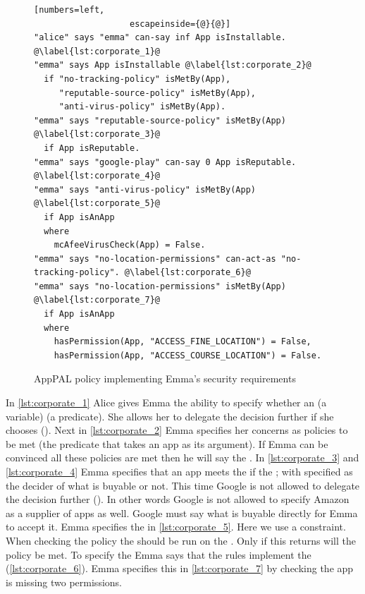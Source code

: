 \documentclass[a4paper]{scrartcl}
\begin{document}
\begin{figure}
\begin{lstlisting}[numbers=left,
                   escapeinside={@}{@}]
"alice" says "emma" can-say inf App isInstallable. @\label{lst:corporate_1}@
"emma" says App isInstallable @\label{lst:corporate_2}@
  if "no-tracking-policy" isMetBy(App),
     "reputable-source-policy" isMetBy(App),
     "anti-virus-policy" isMetBy(App).
"emma" says "reputable-source-policy" isMetBy(App) @\label{lst:corporate_3}@
  if App isReputable.
"emma" says "google-play" can-say 0 App isReputable. @\label{lst:corporate_4}@
"emma" says "anti-virus-policy" isMetBy(App) @\label{lst:corporate_5}@
  if App isAnApp
  where
    mcAfeeVirusCheck(App) = False.
"emma" says "no-location-permissions" can-act-as "no-tracking-policy". @\label{lst:corporate_6}@
"emma" says "no-location-permissions" isMetBy(App) @\label{lst:corporate_7}@
  if App isAnApp
  where
    hasPermission(App, "ACCESS_FINE_LOCATION") = False,
    hasPermission(App, "ACCESS_COURSE_LOCATION") = False.
\end{lstlisting}
\caption{AppPAL policy implementing Emma's security requirements}
\label{lst:corporate}
\end{figure}

In \autoref{lst:corporate_1} Alice gives Emma the ability to specify whether an  (a variable)  (a predicate).
She allows her to delegate the decision further if she chooses ().
Next in \autoref{lst:corporate_2} Emma specifies her concerns as policies to be met (the  predicate that takes an app as its argument).
If Emma can be convinced all these policies are met then he will say the .
In \autoref{lst:corporate_3} and \autoref{lst:corporate_4} Emma specifies that an app meets the  if the ;
  with  specified as the decider of what is buyable or not.
This time Google is not allowed to delegate the decision further ().
In other words Google is not allowed to specify Amazon as a supplier of apps as well.
Google must say what is buyable directly for Emma to accept it.
Emma specifies the  in \autoref{lst:corporate_5}.
Here we use a constraint.
When checking the policy the  should be run on the .
Only if this returns  will the policy be met.
To specify the  Emma says that the  rules implement the  (\autoref{lst:corporate_6}).
Emma specifies this in \autoref{lst:corporate_7} by checking the app is missing two permissions.
\end{document}
